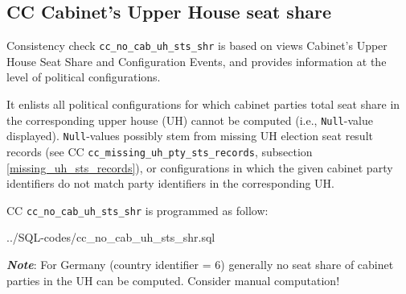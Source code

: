 \subsection{CC Cabinet's Upper House seat share}\label{cc_no_cab_uh_sts_shr}
Consistency check \texttt{\footnotesize cc\_no\_cab\_uh\_sts\_shr} is based on views Cabinet's Upper House Seat Share and Configuration Events, and provides information at the level of political configurations. 

It enlists all political configurations for which cabinet parties total seat share in the corresponding upper house (UH) cannot be computed (i.e., \texttt{\footnotesize Null}-value displayed).
\texttt{\footnotesize Null}-values possibly stem from missing UH election seat result records (see CC \texttt{\footnotesize cc\_missing\_uh\_pty\_sts\_records}, subsection \ref{missing_uh_sts_records}), or configurations in which the given cabinet party identifiers do not match party identifiers in the corresponding UH.

CC \texttt{\footnotesize cc\_no\_cab\_uh\_sts\_shr} is programmed as follow: 

%
{../SQL-codes/cc_no_cab_uh_sts_shr.sql}

{\em {\bf Note}}: For Germany (country identifier = 6) generally no seat share of cabinet parties in the UH can be computed. Consider manual computation!
